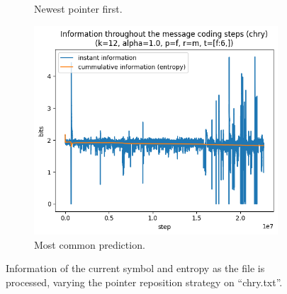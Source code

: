 \documentclass{article}
\begin{document}
\begin{figure}
\begin{subfigure}[b]{0.3\textwidth}
\begin{center}
        \end{center}
        \caption{Newest pointer first.}
        \label{fig:results-reposition-o}
    \end{subfigure}
    \hfill
    \begin{subfigure}[b]{0.3\textwidth}
        \begin{center}
            \includegraphics[width=1.0\linewidth]{../scripts/images/chry_12_1.0_f_m_[f:6,].png}
        \end{center}
        \caption{Most common prediction.}
        \label{fig:results-reposition-m}
    \end{subfigure}
    \caption{Information of the current symbol and entropy as the file is processed, varying the pointer reposition strategy on ``chry.txt''.}
    \label{fig:results-reposition}
\end{figure}
\end{document}
